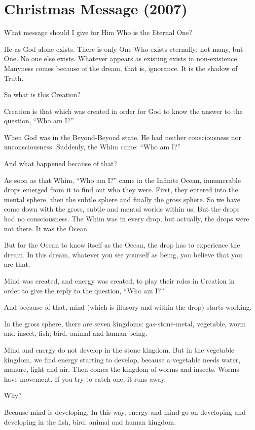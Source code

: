 \section{Christmas Message (2007)}

What message should I give for Him Who is the Eternal One?

He as God alone exists. There is only One Who exists eternally; not many, but One. No one else exists. Whatever appears as existing exists in non-existence. Manyness comes because of the dream, that is, ignorance. It is the shadow of Truth.

So what is this Creation?

Creation is that which was created in order for God to know the answer to the question, ``Who am I?''

When God was in the Beyond-Beyond state, He had neither consciousness nor unconsciousness. Suddenly, the Whim came: ``Who am I?''

And what happened because of that?

As soon as that Whim, ``Who am I?'' came in the Infinite Ocean, innumerable drops emerged from it to find out who they were. First, they entered into the mental sphere, then the subtle sphere and finally the gross sphere. So we have come down with the gross, subtle and mental worlds within us. But the drops had no consciousness. The Whim was in every drop, but actually, the drops were not there. It was the Ocean.

But for the Ocean to know itself as the Ocean, the drop has to experience the dream. In this dream, whatever you see yourself as being, you believe that you are that.

Mind was created, and energy was created, to play their roles in Creation in order to give the reply to the question, ``Who am I?''

And because of that, mind (which is illusory and within the drop) starts working.

In the gross sphere, there are seven kingdoms: gas-stone-metal, vegetable, worm and insect, fish; bird, animal and human being.

Mind and energy do not develop in the stone kingdom. But in the vegetable kingdom, we find energy starting to develop, because a vegetable needs water, manure, light and air. Then comes the kingdom of worms and insects. Worms have movement. If you try to catch one, it runs away.

Why?

Because mind is developing. In this way, energy and mind go on developing and developing in the fish, bird, animal and human kingdom.


